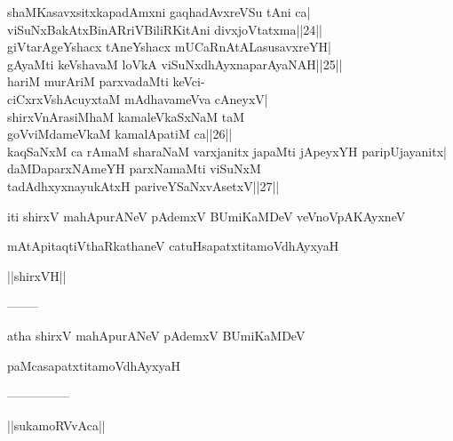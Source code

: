 \documentclass{article}
\begin{document}
shaMKasavxsitxkapadAmxni gaqhadAvxreVSu tAni ca|\\
viSuNxBakAtxBinARriVBiliRKitAni divxjoVtatxma||24||\\
giVtarAgeYshacx tAneYshacx mUCaRnAtALasusavxreYH|\\
gAyaMti keVshavaM loVkA viSuNxdhAyxnaparAyaNAH||25||\\
hariM murAriM parxvadaMti keVci-\\
ciCxrxVshAcuyxtaM mAdhavameVva cAneyxV|\\
shirxVnArasiMhaM kamaleVkaSxNaM taM\\
goVviMdameVkaM kamalApatiM ca||26||\\
kaqSaNxM ca rAmaM sharaNaM varxjanitx
japaMti jApeyxYH paripUjayanitx|\\
daMDaparxNAmeYH parxNamaMti viSuNxM\\
tadAdhxyxnayukAtxH pariveYSaNxvAsetxV||27||

\begin{center}
iti shirxV mahApurANeV pAdemxV BUmiKaMDeV veVnoVpAKAyxneV
\end{center}

\begin{center}
mAtApitaqtiVthaRkathaneV catuHsapatxtitamoVdhAyxyaH
\end{center}

\begin{center}
||shirxVH||
\end{center}

\begin{center}
--------
\end{center}

\begin{center}
atha shirxV mahApurANeV pAdemxV BUmiKaMDeV
\end{center}

\begin{center}
paMcasapatxtitamoVdhAyxyaH
\end{center}

\begin{center}

---------------
\end{center}

\begin{center}
||sukamoRVvAca||
\end{center}
\end{document}
